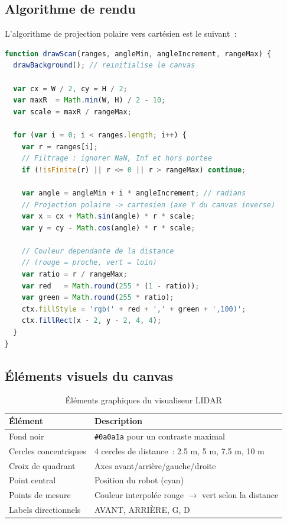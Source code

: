 \documentclass[12pt,a4paper]{report}
\begin{document}
\subsection{Algorithme de rendu}

L'algorithme de projection polaire vers cartésien est le suivant~:

\begin{lstlisting}[language=JavaScript, caption={Rendu LIDAR — projection polaire vers cartésien}]
function drawScan(ranges, angleMin, angleIncrement, rangeMax) {
  drawBackground(); // reinitialise le canvas

  var cx = W / 2, cy = H / 2;
  var maxR  = Math.min(W, H) / 2 - 10;
  var scale = maxR / rangeMax;

  for (var i = 0; i < ranges.length; i++) {
    var r = ranges[i];
    // Filtrage : ignorer NaN, Inf et hors portee
    if (!isFinite(r) || r <= 0 || r > rangeMax) continue;

    var angle = angleMin + i * angleIncrement; // radians
    // Projection polaire -> cartesien (axe Y du canvas inverse)
    var x = cx + Math.sin(angle) * r * scale;
    var y = cy - Math.cos(angle) * r * scale;

    // Couleur dependante de la distance
    // (rouge = proche, vert = loin)
    var ratio = r / rangeMax;
    var red   = Math.round(255 * (1 - ratio));
    var green = Math.round(255 * ratio);
    ctx.fillStyle = 'rgb(' + red + ',' + green + ',100)';
    ctx.fillRect(x - 2, y - 2, 4, 4);
  }
}
\end{lstlisting}

\subsection{Éléments visuels du canvas}

\begin{table}[H]
\centering
\begin{tabularx}{\textwidth}{lX}
\toprule
\textbf{Élément} & \textbf{Description} \\
\midrule
Fond noir & \texttt{\#0a0a1a} pour un contraste maximal \\
Cercles concentriques & 4 cercles de distance~: 2.5 m, 5 m, 7.5 m, 10 m \\
Croix de quadrant & Axes avant/arrière/gauche/droite \\
Point central & Position du robot (cyan) \\
Points de mesure & Couleur interpolée rouge $\rightarrow$ vert selon la distance \\
Labels directionnels & AVANT, ARRIÈRE, G, D \\
\bottomrule
\end{tabularx}
\caption{Éléments graphiques du visualiseur LIDAR}
\end{table}
\end{document}
